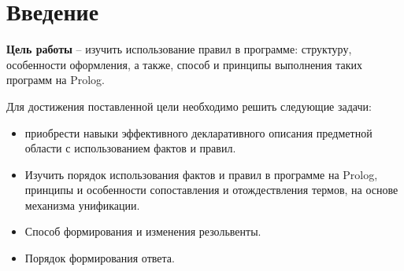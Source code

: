 {\large\section*{Введение}}

\textbf{Цель работы} -- изучить использование правил в программе: структуру, особенности оформления, а также, способ и принципы выполнения таких программ на Prolog.

Для достижения поставленной цели необходимо решить следующие задачи:

\begin{itemize}[$\bullet$]
	\item приобрести навыки эффективного декларативного описания предметной области с использованием фактов и правил.
	\item Изучить порядок использования фактов и правил в программе на Prolog, принципы и особенности сопоставления и отождествления термов, на основе механизма унификации.
	\item Способ формирования и изменения резольвенты.
	\item Порядок формирования ответа.
\end{itemize}
